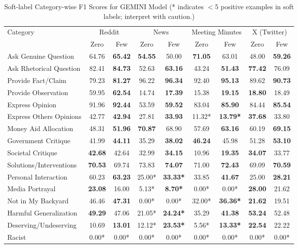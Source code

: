 \begin{table}[htbp]
\centering
\begin{tabular}{l *{8}{c}}
\toprule
Category & \multicolumn{2}{c}{Reddit} & \multicolumn{2}{c}{News} & \multicolumn{2}{c}{Meeting Minutes} & \multicolumn{2}{c}{X (Twitter)} \\
& Zero & Few & Zero & Few & Zero & Few & Zero & Few \\
\midrule
Ask Genuine Question & 64.76 & \textbf{65.42} & \textbf{54.55} & 50.00 & \textbf{71.05} & 63.01 & 48.00 & \textbf{59.26} \\
Ask Rhetorical Question & 82.41 & \textbf{84.73} & 52.63 & \textbf{63.16} & 43.24 & \textbf{51.43} & \textbf{77.42} & 76.09 \\
Provide Fact/Claim & 79.23 & \textbf{81.27} & 96.22 & \textbf{96.34} & 92.40 & \textbf{95.13} & 89.62 & \textbf{90.73} \\
Provide Observation & 59.95 & \textbf{62.54} & 14.74 & \textbf{17.39} & 15.38 & \textbf{19.15} & \textbf{18.80} & 18.49 \\
Express Opinion & 91.96 & \textbf{92.44} & 53.59 & \textbf{59.52} & 83.04 & \textbf{85.90} & 84.44 & \textbf{85.54} \\
Express Others Opinions & 42.77 & \textbf{42.94} & 27.81 & \textbf{33.93} & 11.32* & \textbf{13.79*} & \textbf{37.68} & 33.80 \\
Money Aid Allocation & 48.31 & \textbf{51.96} & \textbf{70.87} & 68.90 & 57.69 & \textbf{63.16} & 60.19 & \textbf{69.15} \\
Government Critique & 41.99 & \textbf{44.11} & 35.29 & \textbf{38.02} & \textbf{46.24} & 45.98 & 51.28 & \textbf{53.10} \\
Societal Critique & \textbf{42.68} & 42.64 & 32.99 & \textbf{34.15} & 10.96 & \textbf{19.35} & \textbf{34.07} & 33.77 \\
Solutions/Interventions & \textbf{70.53} & 69.74 & 73.83 & \textbf{74.07} & 71.00 & \textbf{72.43} & 69.09 & \textbf{70.59} \\
Personal Interaction & 60.23 & \textbf{63.23} & 25.00* & \textbf{33.33*} & 33.85 & \textbf{41.67} & 25.00 & \textbf{28.21} \\
Media Portrayal & \textbf{23.08} & 16.00 & 5.13* & \textbf{8.70*} & 0.00* & 0.00* & \textbf{28.00} & 21.62 \\
Not in My Backyard & 46.46 & \textbf{47.31} & 0.00* & 0.00* & 32.00* & \textbf{36.36*} & \textbf{21.62} & 19.51 \\
Harmful Generalization & \textbf{49.29} & 47.06 & 21.05* & \textbf{24.24*} & 35.29 & \textbf{41.38} & \textbf{53.24} & 52.48 \\
Deserving/Undeserving & 10.69 & \textbf{13.01} & 12.12* & \textbf{23.53*} & 5.56* & \textbf{13.33*} & \textbf{22.54} & 22.22 \\
Racist & 0.00* & 0.00* & 0.00* & 0.00* & 0.00* & 0.00* & 0.00* & 0.00* \\
\bottomrule
\end{tabular}
\centering\caption{Soft-label Category-wise F1 Scores for GEMINI Model (* indicates $<$5 positive examples in soft labels; interpret with caution.)}
\label{tab:gemini_category_breakdown}
\end{table}